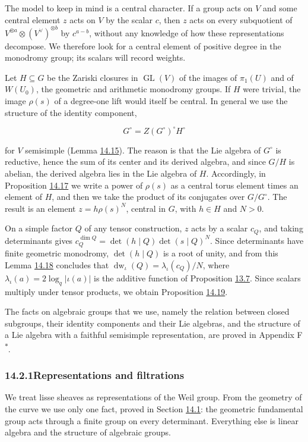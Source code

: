 \documentclass[11pt]{article}
\newcommand{\bpout}[1]{#1\textsuperscript{\hyperlink{bp-outside}{\ensuremath{\ast}}}}
\providecommand{\GL}{}\renewcommand{\GL}{\operatorname{GL}}
\begin{document}
The model to keep in mind is a central character. If a group acts on \(V\) and some central element \(z\) acts on \(V\) by the scalar \(c\), then \(z\) acts on every subquotient of \(V^{\otimes a}\otimes(V^\vee)^{\otimes b}\) by \(c^{a-b}\), without any knowledge of how these representations decompose. We therefore look for a central element of positive degree in the monodromy group; its scalars will record weights.

Let \(H\subseteq G\) be the Zariski closures in \(\GL(V)\) of the images of \(\pi_1(U)\) and of \(W(U_0)\), the geometric and arithmetic monodromy groups. If \(H\) were trivial, the image \(\rho(s)\) of a degree-one lift would itself be central. In general we use the structure of the identity component,

\[
G^\circ=Z(G^\circ)^\circ H^\circ
\]

for \(V\) semisimple (Lemma \hyperref[bp87]{14.15}). The reason is that the Lie algebra of \(G^\circ\) is reductive, hence the sum of its center and its derived algebra, and since \(G/H\) is abelian, the derived algebra lies in the Lie algebra of \(H\). Accordingly, in Proposition \hyperref[bp92]{14.17} we write a power of \(\rho(s)\) as a central torus element times an element of \(H\), and then we take the product of its conjugates over \(G/G^\circ\). The result is an element \(z=h\rho(s)^N\), central in \(G\), with \(h\in H\) and \(N>0\).

On a simple factor \(Q\) of any tensor construction, \(z\) acts by a scalar \(c_Q\), and taking determinants gives \(c_Q^{\dim Q}=\det(h\mid Q)\det(s\mid Q)^N\). Since determinants have finite geometric monodromy, \(\det(h\mid Q)\) is a root of unity, and from this Lemma \hyperref[bp96]{14.18} concludes that \(\operatorname{dw}_\iota(Q)=\lambda_\iota(c_Q)/N\), where \(\lambda_\iota(a)=2\log_q|\iota(a)|\) is the additive function of Proposition \hyperref[bp24]{13.7}. Since scalars multiply under tensor products, we obtain Proposition \hyperref[bp99]{14.19}.

The facts on algebraic groups that we use, namely the relation between closed subgroups, their identity components and their Lie algebras, and the structure of a Lie algebra with a faithful semisimple representation, are proved in Appendix \bpout{F}.

\subsubsection*{\texorpdfstring{14.2.1\quad Representations and filtrations}{14.2.1 Representations and filtrations}}
\label{bp71}%
\label{bp72}%
We treat lisse sheaves as representations of the Weil group. From the geometry of the curve we use only one fact, proved in Section \hyperref[bp41]{14.1}: the geometric fundamental group acts through a finite group on every determinant. Everything else is linear algebra and the structure of algebraic groups.
\end{document}

